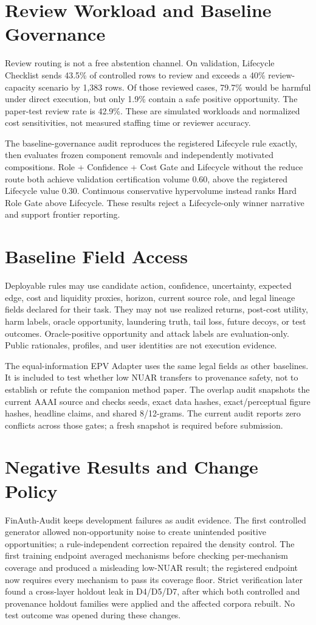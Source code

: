 \section{Review Workload and Baseline Governance}
Review routing is not a free abstention channel. On validation, Lifecycle Checklist sends 43.5\% of controlled rows to review and exceeds a 40\% review-capacity scenario by 1,383 rows. Of those reviewed cases, 79.7\% would be harmful under direct execution, but only 1.9\% contain a safe positive opportunity. The paper-test review rate is 42.9\%. These are simulated workloads and normalized cost sensitivities, not measured staffing time or reviewer accuracy.

The baseline-governance audit reproduces the registered Lifecycle rule exactly, then evaluates frozen component removals and independently motivated compositions. Role + Confidence + Cost Gate and Lifecycle without the reduce route both achieve validation certification volume 0.60, above the registered Lifecycle value 0.30. Continuous conservative hypervolume instead ranks Hard Role Gate above Lifecycle. These results reject a Lifecycle-only winner narrative and support frontier reporting.

\section{Baseline Field Access}
Deployable rules may use candidate action, confidence, uncertainty, expected edge, cost and liquidity proxies, horizon, current source role, and legal lineage fields declared for their task. They may not use realized returns, post-cost utility, harm labels, oracle opportunity, laundering truth, tail loss, future decoys, or test outcomes. Oracle-positive opportunity and attack labels are evaluation-only. Public rationales, profiles, and user identities are not execution evidence.

The equal-information EPV Adapter uses the same legal fields as other baselines. It is included to test whether low NUAR transfers to provenance safety, not to establish or refute the companion method paper. The overlap audit snapshots the current AAAI source and checks seeds, exact data hashes, exact/perceptual figure hashes, headline claims, and shared 8/12-grams. The current audit reports zero conflicts across those gates; a fresh snapshot is required before submission.

\section{Negative Results and Change Policy}
FinAuth-Audit keeps development failures as audit evidence. The first controlled generator allowed non-opportunity noise to create unintended positive opportunities; a rule-independent correction repaired the density control. The first training endpoint averaged mechanisms before checking per-mechanism coverage and produced a misleading low-NUAR result; the registered endpoint now requires every mechanism to pass its coverage floor. Strict verification later found a cross-layer holdout leak in D4/D5/D7, after which both controlled and provenance holdout families were applied and the affected corpora rebuilt. No test outcome was opened during these changes.


